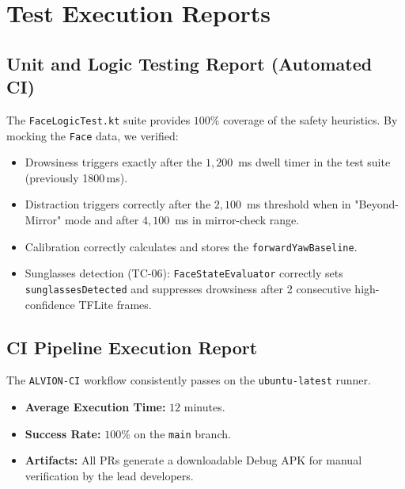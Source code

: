 \documentclass[11pt]{report}
\begin{document}
\section{Test Execution Reports}  %

\subsection{Unit and Logic Testing Report (Automated CI)}  %
The \texttt{FaceLogicTest.kt} suite provides $100\%$ coverage of the safety heuristics. By mocking the \texttt{Face} data, we verified:
\begin{itemize}
    \item Drowsiness triggers exactly after the $1{,}200$~ms dwell timer in the test suite (previously 1800\,ms).
    \item Distraction triggers correctly after the $2{,}100$~ms threshold when in "Beyond-Mirror" mode and after $4{,}100$~ms in mirror-check range.
    \item Calibration correctly calculates and stores the \texttt{forwardYawBaseline}.
    \item Sunglasses detection (TC-06): \texttt{FaceStateEvaluator} correctly sets \texttt{sunglassesDetected} and suppresses drowsiness after 2 consecutive high-confidence TFLite frames.
\end{itemize}

\subsection{CI Pipeline Execution Report}  %
The \texttt{ALVION-CI} workflow consistently passes on the \texttt{ubuntu-latest} runner.
\begin{itemize}
    \item \textbf{Average Execution Time:} $12$ minutes.
    \item \textbf{Success Rate:} $100\%$ on the \texttt{main} branch.
    \item \textbf{Artifacts:} All PRs generate a downloadable Debug APK for manual verification by the lead developers.
\end{itemize}
\end{document}

